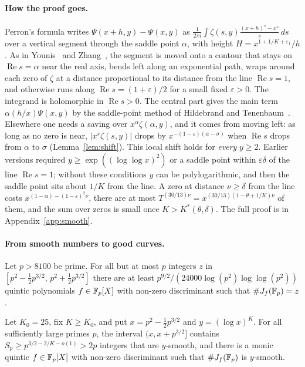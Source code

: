\paragraph{How the proof goes.}
Perron's formula writes $\Psi(x+h,y)-\Psi(x,y)$ as $\frac1{2\pi i}\int\zeta(s,y)\frac{(x+h)^s-x^s}{s}\,ds$
over a vertical segment through the saddle point $\alpha$, with height $H=x^{1+1/K+\varepsilon_1}/h$. As in
Younis~\cite{You24} and Zhang~\cite{Zha26}, the segment is moved onto a contour that stays on
$\operatorname{Re}s=\alpha$ near the real axis, bends left along an exponential path, wraps around each zero
of $\zeta$ at a distance proportional to its distance from the line $\operatorname{Re}s=1$, and otherwise runs
along $\operatorname{Re}s=(1+\varepsilon)/2$ for a small fixed $\varepsilon>0$. The integrand is holomorphic
in $\operatorname{Re}s>0$. The central part gives the main term $\alpha(h/x)\Psi(x,y)$ by the saddle-point
method of Hildebrand and Tenenbaum~\cite{HT86}. Elsewhere one needs a saving over $x^\alpha\zeta(\alpha,y)$,
and it comes from moving left: as long as no zero is near, $|x^s\zeta(s,y)|$ drops by
$x^{-(1-\varepsilon)(\alpha-\sigma)}$ when $\operatorname{Re}s$ drops from $\alpha$ to $\sigma$
(Lemma~\ref{lem:shift}). This local shift holds for \emph{every} $y\ge2$. Earlier versions required
$y\ge\exp((\log\log x)^2)$ or a saddle point within $\varepsilon\delta$ of the line $\operatorname{Re}s=1$;
without these conditions $y$ can be polylogarithmic, and then the saddle point sits about $1/K$ from the
line. A zero at distance $\nu\ge\delta$ from the line costs $x^{(1-\alpha)-(1-\varepsilon)^2\nu}$, there are
at most $T^{(30/13)\nu}=x^{(30/13)(1-\theta+1/K)\nu}$ of them, and the sum over zeros is small once
$K>K^*(\theta,\delta)$. The full proof is in Appendix~\ref{app:smooth}.

\paragraph{From smooth numbers to good curves.}
\begin{theorem}\label{thm:lpp}
Let $p>8100$ be prime. For all but at most $p$ integers $z$ in $[p^2-\tfrac12p^{3/2},\,p^2+\tfrac12p^{3/2}]$
there are at least $p^{9/2}/(24000\log(p^2)\log\log(p^2))$ quintic polynomials $f\in\mathbb{F}_p[X]$ with non-zero
discriminant such that $\#J_f(\mathbb{F}_p)=z$.
\end{theorem}

\begin{proposition}\label{prop:goodcurve}
Let $K_0=25$, fix $K\ge K_0$, and put $x=p^2-\tfrac12p^{3/2}$ and $y=(\log x)^K$. For all sufficiently large
primes $p$, the interval $(x,x+p^{3/2}]$ contains $S_p\ge p^{3/2-2/K-o(1)}>2p$ integers that are $y$-smooth,
and there is a monic quintic $f\in\mathbb{F}_p[X]$ with non-zero discriminant such that $\#J_f(\mathbb{F}_p)$ is $y$-smooth.
\end{proposition}

